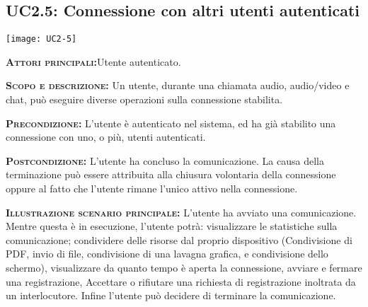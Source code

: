\subsection{UC2.5: Connessione con altri utenti autenticati}
\begin{center}
\texttt{[image: UC2-5]}
\end{center}
\begin{description}
\item{\scshape\bfseries Attori principali:}Utente autenticato.
\item{\scshape\bfseries Scopo e descrizione:} Un utente, durante una chiamata audio, audio/video e chat, può eseguire diverse operazioni sulla connessione stabilita.
\item{\scshape\bfseries Precondizione:} L'utente è autenticato nel sistema, ed ha già stabilito una connessione con uno, o più, utenti autenticati.
\item{\scshape\bfseries Postcondizione:} L'utente ha concluso la comunicazione. La causa della terminazione può essere attribuita alla chiusura volontaria della connessione oppure al fatto che l'utente rimane l'unico attivo nella connessione.
\item{\scshape\bfseries Illustrazione scenario principale:} L'utente ha avviato una comunicazione. Mentre questa è in esecuzione, l'utente potrà: visualizzare le statistiche sulla comunicazione; condividere delle risorse dal proprio dispositivo (Condivisione di PDF, invio di file, condivisione di una lavagna grafica, e condivisione dello schermo), visualizzare da quanto tempo è aperta la connessione, avviare e fermare una registrazione, Accettare o rifiutare una richiesta di registrazione inoltrata da un interlocutore. Infine l'utente può decidere di terminare la comunicazione.
\end{description}

